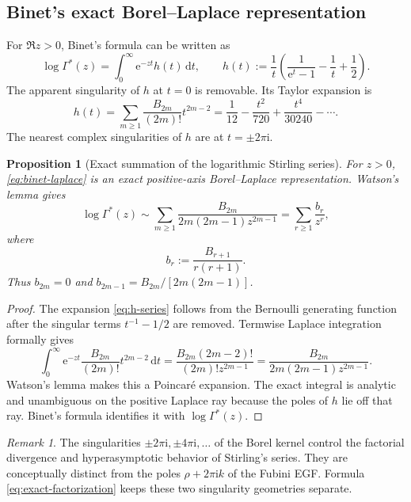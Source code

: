 \documentclass[11pt,a4paper,oneside]{article}
\newtheorem{proposition}[theorem]{Proposition}
\theoremstyle{definition}
\theoremstyle{remark}
\newtheorem{remark}[theorem]{Remark}
\newcommand{\e}{\mathrm{e}}
\newcommand{\ii}{\mathrm{i}}
\newcommand{\dd}{\,\mathrm{d}}
\newcommand{\GammaStar}{\Gamma^{\!*}}
\newcommand{\asympseries}{\mathrel{\sim}}
\begin{document}
\subsection{Binet's exact Borel--Laplace representation}
For $\Re z>0$, Binet's formula can be written as
\begin{equation}\label{eq:binet-laplace}
 \log\GammaStar(z)
 =\int_0^\infty \e^{-zt}h(t)\dd t,
 \qquad
 h(t):=\frac1t\left(\frac{1}{\e^t-1}-\frac1t+\frac12\right).
\end{equation}
The apparent singularity of $h$ at $t=0$ is removable.  Its Taylor expansion is
\begin{equation}\label{eq:h-series}
 h(t)=\sum_{m\ge1}\frac{B_{2m}}{(2m)!}t^{2m-2}
 =\frac1{12}-\frac{t^2}{720}+\frac{t^4}{30240}-\cdots.
\end{equation}
The nearest complex singularities of $h$ are at $t=\pm2\pi\ii$.

\begin{proposition}[Exact summation of the logarithmic Stirling series]
\label{prop:binet-borel}
For $z>0$, \cref{eq:binet-laplace} is an exact positive-axis
Borel--Laplace representation.  Watson's lemma gives
\begin{equation}\label{eq:log-gammastar-asymp}
 \log\GammaStar(z)
 \asympseries
 \sum_{m\ge1}\frac{B_{2m}}{2m(2m-1)z^{2m-1}}
 =\sum_{r\ge1}\frac{b_r}{z^r},
\end{equation}
where
\begin{equation}\label{eq:b-def}
 b_r:=\frac{B_{r+1}}{r(r+1)}.
\end{equation}
Thus $b_{2m}=0$ and
$\displaystyle b_{2m-1}=B_{2m}/[2m(2m-1)]$.
\end{proposition}

\begin{proof}
The expansion \cref{eq:h-series} follows from the Bernoulli generating
function after the singular terms $t^{-1}-1/2$ are removed.  Termwise Laplace
integration formally gives
\[
 \int_0^\infty \e^{-zt}
 \frac{B_{2m}}{(2m)!}t^{2m-2}\dd t
 =\frac{B_{2m}(2m-2)!}{(2m)!z^{2m-1}}
 =\frac{B_{2m}}{2m(2m-1)z^{2m-1}}.
\]
Watson's lemma makes this a Poincar\'e expansion.  The exact integral is
analytic and unambiguous on the positive Laplace ray because the poles of
$h$ lie off that ray.  Binet's formula identifies it with
$\log\GammaStar(z)$.
\end{proof}

\begin{remark}
The singularities $\pm2\pi\ii,\pm4\pi\ii,\ldots$ of the Borel kernel control
the factorial divergence and hyperasymptotic behavior of Stirling's series.
They are conceptually distinct from the poles
$\rho+2\pi\ii k$ of the Fubini EGF.  Formula \cref{eq:exact-factorization}
keeps these two singularity geometries separate.
\end{remark}
\end{document}
